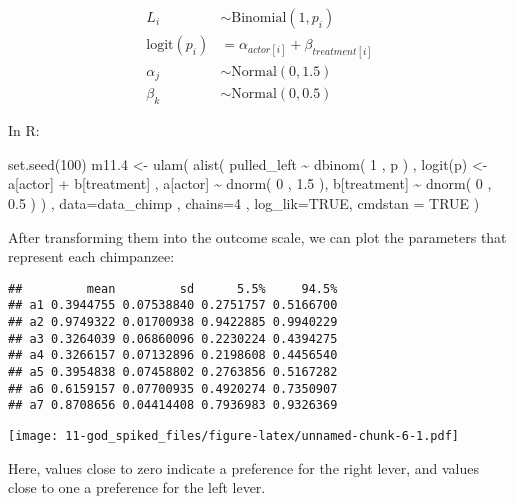 \documentclass[
]{book}
\newenvironment{Shaded}{\begin{snugshade}}{\end{snugshade}}
\newcommand{\AttributeTok}[1]{\textcolor[rgb]{0.77,0.63,0.00}{#1}}
\newcommand{\ConstantTok}[1]{\textcolor[rgb]{0.00,0.00,0.00}{#1}}
\newcommand{\DecValTok}[1]{\textcolor[rgb]{0.00,0.00,0.81}{#1}}
\newcommand{\FloatTok}[1]{\textcolor[rgb]{0.00,0.00,0.81}{#1}}
\newcommand{\FunctionTok}[1]{\textcolor[rgb]{0.00,0.00,0.00}{#1}}
\newcommand{\NormalTok}[1]{#1}
\newcommand{\OtherTok}[1]{\textcolor[rgb]{0.56,0.35,0.01}{#1}}
\newcommand{\SpecialCharTok}[1]{\textcolor[rgb]{0.00,0.00,0.00}{#1}}
\begin{document}
\[
\begin{aligned}
L_i &\sim \text{Binomial}(1,p_i) \\
\text{logit}(p_i) &= \alpha_{actor[i]} + \beta_{treatment[i]} \\
\alpha_j &\sim \text{Normal}(0,1.5) \\
\beta_k &\sim \text{Normal}(0,0.5)
\end{aligned}
\]

In R:

\begin{Shaded}
\begin{Highlighting}[]
\FunctionTok{set.seed}\NormalTok{(}\DecValTok{100}\NormalTok{)}
\NormalTok{m11}\FloatTok{.4} \OtherTok{\textless{}{-}} \FunctionTok{ulam}\NormalTok{( }\FunctionTok{alist}\NormalTok{(}
\NormalTok{  pulled\_left }\SpecialCharTok{\textasciitilde{}} \FunctionTok{dbinom}\NormalTok{( }\DecValTok{1}\NormalTok{ , p ) , }
  \FunctionTok{logit}\NormalTok{(p) }\OtherTok{\textless{}{-}}\NormalTok{ a[actor] }\SpecialCharTok{+}\NormalTok{ b[treatment] , }
\NormalTok{  a[actor] }\SpecialCharTok{\textasciitilde{}} \FunctionTok{dnorm}\NormalTok{( }\DecValTok{0}\NormalTok{ , }\FloatTok{1.5}\NormalTok{ ), }
\NormalTok{  b[treatment] }\SpecialCharTok{\textasciitilde{}} \FunctionTok{dnorm}\NormalTok{( }\DecValTok{0}\NormalTok{ , }\FloatTok{0.5}\NormalTok{ )}
\NormalTok{) , }\AttributeTok{data=}\NormalTok{data\_chimp , }\AttributeTok{chains=}\DecValTok{4}\NormalTok{ , }\AttributeTok{log\_lik=}\ConstantTok{TRUE}\NormalTok{, }\AttributeTok{cmdstan =} \ConstantTok{TRUE}\NormalTok{ )}
\end{Highlighting}
\end{Shaded}

After transforming them into the outcome scale, we can plot the parameters that represent each chimpanzee:

\begin{verbatim}
##         mean         sd      5.5%     94.5%
## a1 0.3944755 0.07538840 0.2751757 0.5166700
## a2 0.9749322 0.01700938 0.9422885 0.9940229
## a3 0.3264039 0.06860096 0.2230224 0.4394275
## a4 0.3266157 0.07132896 0.2198608 0.4456540
## a5 0.3954838 0.07458802 0.2763856 0.5167282
## a6 0.6159157 0.07700935 0.4920274 0.7350907
## a7 0.8708656 0.04414408 0.7936983 0.9326369
\end{verbatim}

\texttt{[image: 11-god\_spiked\_files/figure-latex/unnamed-chunk-6-1.pdf]}

Here, values close to zero indicate a preference for the right lever, and values close to one a preference for the left lever.
\end{document}
